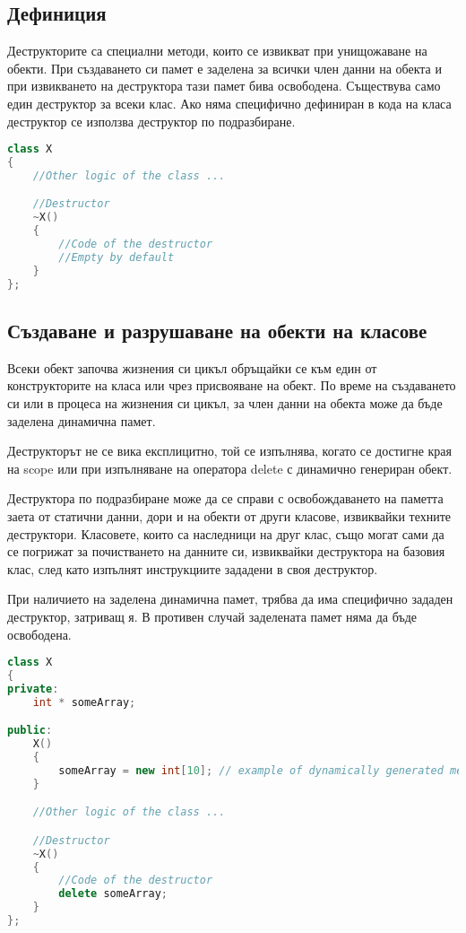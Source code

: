 \documentclass[fleqn,12pt]{article}
\begin{document}
\subsection{Дефиниция}
Деструкторите са специални методи, които се извикват при унищожаване на обекти. При създаването си памет е заделена за всички член данни на обекта и при извикването на деструктора тази памет бива освободена. Съществува само един деструктор за всеки клас. Ако няма специфично дефиниран в кода на класа деструктор се използва деструктор по подразбиране. 

\begin{lstlisting}[language=C++, caption=Example destructor]
class X
{
    //Other logic of the class ...

    //Destructor
    ~X()
    {
        //Code of the destructor
        //Empty by default
    }
};
\end{lstlisting}
    

\subsection{Създаване и разрушаване на обекти на класове}
Всеки обект започва жизнения си цикъл обръщайки се към един от конструкторите на класа или чрез присвояване на обект. По време на създаването си или в процеса на жизнения си цикъл, за член данни на обекта може да бъде заделена динамична памет. 

Деструкторът не се вика експлицитно, той се изпълнява, когато се достигне края на scope или при изпълняване на оператора delete с динамично генериран обект. 

Деструктора по подразбиране може да се справи с освобождаването на паметта заета от статични данни, дори и на обекти от други класове, извиквайки техните деструктори. Класовете, които са наследници на друг клас, също могат сами да се погрижат за почистването на данните си, извиквайки деструктора на базовия клас, след като изпълнят инструкциите зададени в своя деструктор.

При наличието на заделена динамична памет, трябва да има специфично зададен деструктор, затриващ я. В противен случай заделената памет няма да бъде освободена.

\begin{lstlisting}[language=C++, caption=Example custom destructor]
class X
{
private:
    int * someArray;

public:
    X() 
    {
        someArray = new int[10]; // example of dynamically generated memory
    }

    //Other logic of the class ...

    //Destructor
    ~X()
    {
        //Code of the destructor
        delete someArray;
    }
};
\end{lstlisting}
\end{document}
